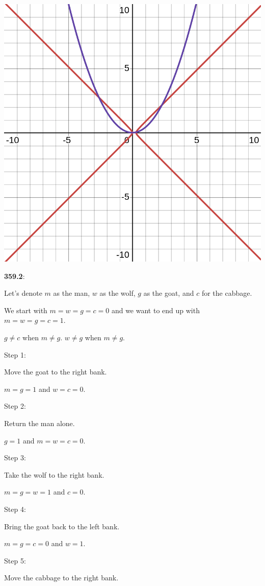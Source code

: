 \documentclass{article}
\begin{document}
\includegraphics[width=\linewidth]{conic_pic_3.png}


\textbf{359.2}:

Let's denote $m$ as the man, $w$ as the wolf, $g$ as the goat, and $c$ for the cabbage.

We start with $m = w = g = c = 0$ and we want to end up with $m = w = g = c = 1$.

$g \neq c$ when $m \neq g$.
$w \neq g$ when $m \neq g$.

Step 1:

Move the goat to the right bank.

$m = g = 1$ and $w = c = 0$.

Step 2:

Return the man alone.

$g = 1$ and $m = w = c = 0$.

Step 3:

Take the wolf to the right bank.

$m = g = w = 1$ and $c = 0$.

Step 4:

Bring the goat back to the left bank.

$m = g = c = 0$ and $w = 1$.

Step 5:

Move the cabbage to the right bank.
\end{document}
